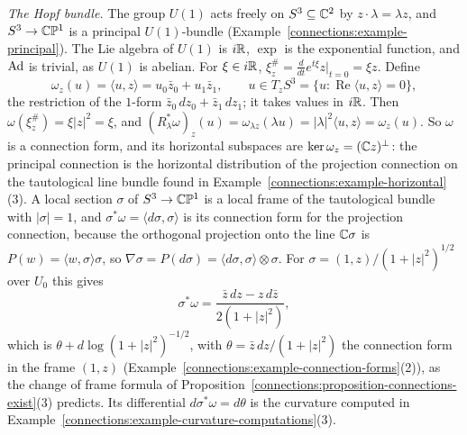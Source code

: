 \begin{example}\label{connections:example-hopf-connection}
\emph{The Hopf bundle.} The group $U(1)$ acts freely on $S^3 \subseteq \mathbb{C}^2$ by $z \cdot \lambda = \lambda z$, and $S^3 \to \mathbb{C}\mathbb{P}^1$ is a principal $U(1)$-bundle
(Example~\ref{connections:example-principal}). The Lie algebra of $U(1)$ is $i\mathbb{R}$, $\exp$ is the exponential function, and $\operatorname{Ad}$ is trivial, as $U(1)$ is abelian. For $\xi \in i\mathbb{R}$,
$\xi^\#_z = \frac{d}{dt}e^{t\xi}z\big|_{t=0} = \xi z$. Define
\[
\omega_z(u) = \langle u, z\rangle = u_0\bar z_0 + u_1\bar z_1, \qquad u \in T_zS^3 = \{u : \operatorname{Re}\langle u, z\rangle = 0\},
\]
the restriction of the $1$-form $\bar z_0\,dz_0 + \bar z_1\,dz_1$; it takes values in $i\mathbb{R}$. Then $\omega(\xi^\#_z) = \xi|z|^2 = \xi$, and
$(R_\lambda^*\omega)_z(u) = \omega_{\lambda z}(\lambda u) = |\lambda|^2\langle u, z\rangle = \omega_z(u)$. So $\omega$ is a connection form, and its horizontal subspaces are
$\ker\omega_z = (\mathbb{C} z)^\perp$: the principal connection is the horizontal distribution of the projection connection on the tautological line bundle found in
Example~\ref{connections:example-horizontal}(3). A local section $\sigma$ of $S^3 \to \mathbb{C}\mathbb{P}^1$ is a local frame of the tautological bundle with $|\sigma| = 1$, and $\sigma^*\omega =
\langle d\sigma, \sigma\rangle$ is its connection form for the projection connection, because the orthogonal projection onto the line $\mathbb{C}\sigma$ is $P(w) = \langle w, \sigma\rangle\sigma$, so
$\nabla\sigma = P(d\sigma) = \langle d\sigma, \sigma\rangle \otimes \sigma$. For $\sigma = (1, z)/(1 + |z|^2)^{1/2}$ over $U_0$ this gives
\[
\sigma^*\omega = \frac{\bar z\,dz - z\,d\bar z}{2(1 + |z|^2)},
\]
which is $\theta + d\log(1 + |z|^2)^{-1/2}$, with $\theta = \bar z\,dz/(1 + |z|^2)$ the connection form in the frame $(1, z)$ (Example~\ref{connections:example-connection-forms}(2)), as the change
of frame formula of Proposition~\ref{connections:proposition-connections-exist}(3) predicts. Its differential $d\sigma^*\omega = d\theta$ is the curvature computed in
Example~\ref{connections:example-curvature-computations}(3).
\end{example}
